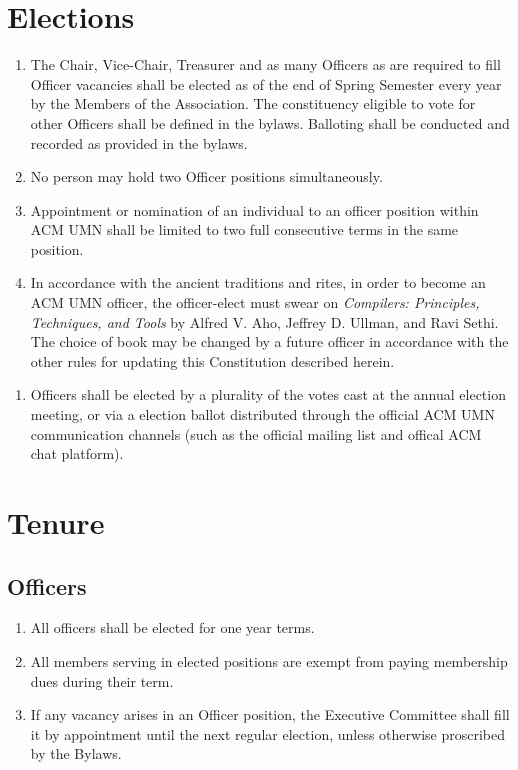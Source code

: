 \section{Elections}
\begin{enumerate}
	\item The Chair, Vice-Chair, Treasurer and as many Officers as are required to fill Officer vacancies shall be elected as of the end of Spring Semester every year by the Members of the Association. The constituency eligible to vote for other Officers shall be defined in the bylaws. Balloting shall be conducted and recorded as provided in the bylaws.
	\item No person may hold two Officer positions simultaneously.
	\item Appointment or nomination of an individual to an officer position within ACM UMN shall be limited to two full consecutive terms in the same position.
    \item In accordance with the ancient traditions and rites, in order to become an ACM UMN officer, the officer-elect must swear on \emph{Compilers: Principles, Techniques, and Tools} by Alfred V. Aho, Jeffrey D. Ullman, and Ravi Sethi. The choice of book may be changed by a future officer in accordance with the other rules for updating this Constitution described herein.
\end{enumerate}

\begin{enumerate}
	\item Officers shall be elected by a plurality of the votes cast at the annual election meeting, or via a election ballot distributed through the official ACM UMN communication channels (such as the official mailing list and offical ACM chat platform).
\end{enumerate}

\section{Tenure}

\subsection{Officers}
\begin{enumerate}
	\item All officers shall be elected for one year terms.
	\item All members serving in elected positions are exempt from paying membership dues during their term.
	\item If any vacancy arises in an Officer position, the Executive Committee shall fill it by appointment until the next regular election, unless otherwise proscribed by the Bylaws.
\end{enumerate}

